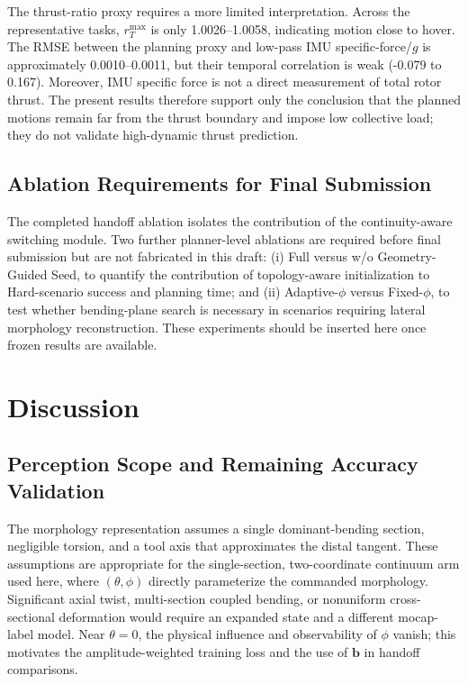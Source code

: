 \documentclass[journal,twoside]{IEEEtran}
\begin{document}
The thrust-ratio proxy requires a more limited interpretation. Across the representative tasks, $r_T^{\max}$ is only 1.0026--1.0058, indicating motion close to hover. The RMSE between the planning proxy and low-pass IMU specific-force/$g$ is approximately 0.0010--0.0011, but their temporal correlation is weak (-0.079 to 0.167). Moreover, IMU specific force is not a direct measurement of total rotor thrust. The present results therefore support only the conclusion that the planned motions remain far from the thrust boundary and impose low collective load; they do not validate high-dynamic thrust prediction.

\subsection{Ablation Requirements for Final Submission}
The completed handoff ablation isolates the contribution of the continuity-aware switching module. Two further planner-level ablations are required before final submission but are not fabricated in this draft: (i) Full versus w/o Geometry-Guided Seed, to quantify the contribution of topology-aware initialization to Hard-scenario success and planning time; and (ii) Adaptive-$\phi$ versus Fixed-$\phi$, to test whether bending-plane search is necessary in scenarios requiring lateral morphology reconstruction. These experiments should be inserted here once frozen results are available.

\section{Discussion}
\subsection{Perception Scope and Remaining Accuracy Validation}
The morphology representation assumes a single dominant-bending section, negligible torsion, and a tool axis that approximates the distal tangent. These assumptions are appropriate for the single-section, two-coordinate continuum arm used here, where $(\theta,\phi)$ directly parameterize the commanded morphology. Significant axial twist, multi-section coupled bending, or nonuniform cross-sectional deformation would require an expanded state and a different mocap-label model. Near $\theta=0$, the physical influence and observability of $\phi$ vanish; this motivates the amplitude-weighted training loss and the use of $\mathbf b$ in handoff comparisons.
\end{document}
